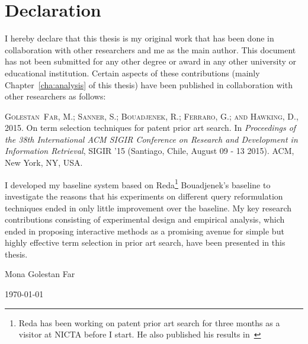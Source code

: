 \chapter*{Declaration}
\vspace{-1em}
I hereby declare that this thesis is my original work that has been done in 
collaboration with other researchers and me as the main author. This document has
not been submitted for any other degree or award in any other university or educational 
institution. 
Certain aspects of these contributions (mainly Chapter~\ref{cha:analysis} of this thesis) have been published in 
collaboration with other researchers as follows:
\begin{itemize}
\textsc{Golestan~Far, M.; Sanner, S.; Bouadjenek, R.; Ferraro, G.; and Hawking,
  D.}, 2015.
\newblock On term selection techniques for patent prior art search.
\newblock In \emph{Proceedings of the 38th International ACM SIGIR Conference
  on Research and Development in Information Retrieval}, SIGIR '15 (Santiago,
  Chile, August 09 - 13 2015). ACM, New York, NY, USA.
  
\end{itemize}
I developed my baseline system based on Reda\footnote{Reda has been working on patent prior art search for three months as a visitor at NICTA before I start. He also published his results in~\citep{Bouadjenek:2015:SQR:2746090.2746092}} Bouadjenek's baseline 
to investigate the reasons that his experiments on different query reformulation 
techniques ended in only little improvement over the baseline. My key research contributions consisting of experimental design and empirical analysis, which ended in proposing interactive methods as a promising avenue for simple but highly effective term selection in prior art search, have been presented in this thesis.  

\vspace*{4cm}

\hspace{8cm}Mona Golestan Far\par
\hspace{8cm}\today
